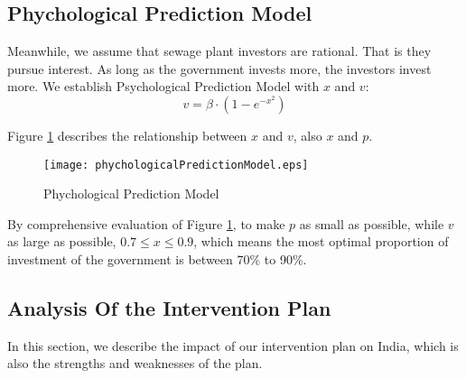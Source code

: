 \documentclass[tcn = 45538, sheet = true, abstract = true]{mcmthesis}
\begin{document}
\subsection{Phychological Prediction Model}

\hspace{1.5 em} Meanwhile, 
we assume that sewage plant investors are rational. 
That is they pursue interest. 
As long as the government invests more, 
the investors invest more. 
We establish Psychological Prediction Model with $x$ and $v$:
\begin{equation}
v = \beta \cdot (1 - e^{-x^2})
\end{equation}

Figure \ref{fig:phychologicalPredictionModel} describes the relationship between $x$ and $v$, 
also $x$ and $p$.

\begin{figure}[]
\small
\centering
\texttt{[image: phychologicalPredictionModel.eps]}
\caption{Phychological Prediction Model} \label{fig:phychologicalPredictionModel}
\end{figure}

By comprehensive evaluation of Figure \ref{fig:phychologicalPredictionModel}, 
to make $p$ as small as possible, 
while $v$ as large as possible, 
$0.7 \leqslant x \leqslant 0.9$, 
which means the most optimal proportion of investment of the government is between 70\% to 90\%.

\subsection{Analysis Of the Intervention Plan}

\hspace{1.5 em} In this section, 
we describe the impact of our intervention plan on India, 
which is also the strengths and weaknesses of the plan.
\end{document}
